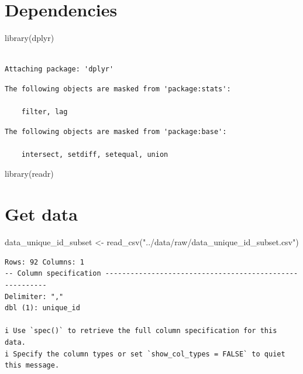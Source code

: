 \documentclass[
  letterpaper,
  DIV=11,
  numbers=noendperiod]{scrreprt}
\newenvironment{Shaded}{\begin{snugshade}}{\end{snugshade}}
\newcommand{\FunctionTok}[1]{\textcolor[rgb]{0.28,0.35,0.67}{#1}}
\newcommand{\NormalTok}[1]{\textcolor[rgb]{0.00,0.23,0.31}{#1}}
\newcommand{\OtherTok}[1]{\textcolor[rgb]{0.00,0.23,0.31}{#1}}
\newcommand{\StringTok}[1]{\textcolor[rgb]{0.13,0.47,0.30}{#1}}
\begin{document}
\section{Dependencies}\label{dependencies-3}

\begin{Shaded}
\begin{Highlighting}[]
\FunctionTok{library}\NormalTok{(dplyr)}
\end{Highlighting}
\end{Shaded}

\begin{verbatim}

Attaching package: 'dplyr'
\end{verbatim}

\begin{verbatim}
The following objects are masked from 'package:stats':

    filter, lag
\end{verbatim}

\begin{verbatim}
The following objects are masked from 'package:base':

    intersect, setdiff, setequal, union
\end{verbatim}

\begin{Shaded}
\begin{Highlighting}[]
\FunctionTok{library}\NormalTok{(readr)}
\end{Highlighting}
\end{Shaded}

\section{Get data}\label{get-data}

\begin{Shaded}
\begin{Highlighting}[]
\NormalTok{data\_unique\_id\_subset }\OtherTok{\textless{}{-}} \FunctionTok{read\_csv}\NormalTok{(}\StringTok{"../data/raw/data\_unique\_id\_subset.csv"}\NormalTok{)}
\end{Highlighting}
\end{Shaded}

\begin{verbatim}
Rows: 92 Columns: 1
-- Column specification --------------------------------------------------------
Delimiter: ","
dbl (1): unique_id

i Use `spec()` to retrieve the full column specification for this data.
i Specify the column types or set `show_col_types = FALSE` to quiet this message.
\end{verbatim}
\end{document}
